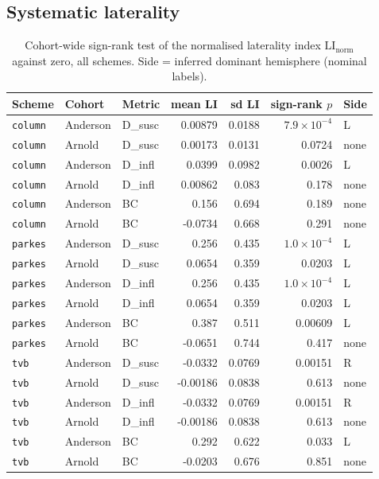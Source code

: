 \subsection{Systematic laterality}
\begin{table}[H]\centering\small
\caption{Cohort-wide sign-rank test of the normalised laterality index $\mathrm{LI}_{\mathrm{norm}}$ against zero, all schemes. Side = inferred dominant hemisphere (nominal labels).}
\begin{tabular}{@{}lllrrrl@{}}\toprule
Scheme & Cohort & Metric & mean LI & sd LI & sign-rank $p$ & Side \\\midrule
\texttt{column} & Anderson & D\_susc & 0.00879 & 0.0188 & $7.9\!\times\!10^{-4}$ & L \\
\texttt{column} & Arnold & D\_susc & 0.00173 & 0.0131 & 0.0724 & none \\
\texttt{column} & Anderson & D\_infl & 0.0399 & 0.0982 & 0.0026 & L \\
\texttt{column} & Arnold & D\_infl & 0.00862 & 0.083 & 0.178 & none \\
\texttt{column} & Anderson & BC & 0.156 & 0.694 & 0.189 & none \\
\texttt{column} & Arnold & BC & -0.0734 & 0.668 & 0.291 & none \\
\midrule
\texttt{parkes} & Anderson & D\_susc & 0.256 & 0.435 & $1.0\!\times\!10^{-4}$ & L \\
\texttt{parkes} & Arnold & D\_susc & 0.0654 & 0.359 & 0.0203 & L \\
\texttt{parkes} & Anderson & D\_infl & 0.256 & 0.435 & $1.0\!\times\!10^{-4}$ & L \\
\texttt{parkes} & Arnold & D\_infl & 0.0654 & 0.359 & 0.0203 & L \\
\texttt{parkes} & Anderson & BC & 0.387 & 0.511 & 0.00609 & L \\
\texttt{parkes} & Arnold & BC & -0.0651 & 0.744 & 0.417 & none \\
\midrule
\texttt{tvb} & Anderson & D\_susc & -0.0332 & 0.0769 & 0.00151 & R \\
\texttt{tvb} & Arnold & D\_susc & -0.00186 & 0.0838 & 0.613 & none \\
\texttt{tvb} & Anderson & D\_infl & -0.0332 & 0.0769 & 0.00151 & R \\
\texttt{tvb} & Arnold & D\_infl & -0.00186 & 0.0838 & 0.613 & none \\
\texttt{tvb} & Anderson & BC & 0.292 & 0.622 & 0.033 & L \\
\texttt{tvb} & Arnold & BC & -0.0203 & 0.676 & 0.851 & none \\
\bottomrule\end{tabular}\end{table}

